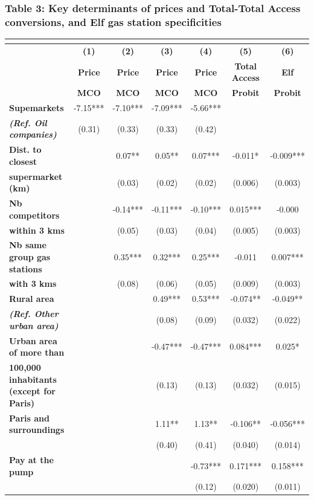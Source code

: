 \documentclass[english]{article}
\begin{document}
\subsubsection*{Table 3: Key determinants of prices and Total-Total Access conversions, and Elf gas station specificities}

\begin{center}
\begin{footnotesize} %
\begin{tabular}{l|cccccc}
\multicolumn{1}{l}{} &  &  &  &  &  & \tabularnewline
\hline
\hline
 & \textbf{(1)}  & \textbf{(2)}  & \textbf{(3)}  & \textbf{(4)}  & \textbf{(5)}  & \textbf{(6)}\tabularnewline
 & \textbf{Price}  & \textbf{Price}  & \textbf{Price}  & \textbf{Price}  & \textbf{Total Access}  & \textbf{Elf}\tabularnewline
 & \textbf{MCO}  & \textbf{MCO}  & \textbf{MCO}  & \textbf{MCO}  & \textbf{Probit}  & \textbf{Probit}\tabularnewline
\hline
\textbf{Supemarkets}  & -7.15{*}{*}{*}  & -7.10{*}{*}{*}  & -7.09{*}{*}{*}  & -5.66{*}{*}{*}  &  & \tabularnewline
\textbf{\textit{(Ref. Oil companies)}}  & (0.31)  & (0.33)  & (0.33)  & (0.42)  &  & \tabularnewline
\hline
\textbf{Dist. to closest}  &  & 0.07{*}{*}  & 0.05{*}{*}  & 0.07{*}{*}{*}  & -0.011{*}  & -0.009{*}{*}{*}\tabularnewline
\textbf{supermarket (km)}  &  & (0.03)  & (0.02)  & (0.02)  & (0.006)  & (0.003)\tabularnewline
\textbf{Nb competitors}  &  & -0.14{*}{*}{*}  & -0.11{*}{*}{*}  & -0.10{*}{*}{*}  & 0.015{*}{*}{*}  & -0.000\tabularnewline
\textbf{within 3 kms}  &  & (0.05)  & (0.03)  & (0.04)  & (0.005)  & (0.003)\tabularnewline
\textbf{Nb same group gas stations}  &  & 0.35{*}{*}{*}  & 0.32{*}{*}{*}  & 0.25{*}{*}{*}  & -0.011  & 0.007{*}{*}{*}\tabularnewline
\textbf{with 3 kms}  &  & (0.08)  & (0.06)  & (0.05)  & (0.009)  & (0.003)\tabularnewline
\hline
\textbf{Rural area}  &  &  & 0.49{*}{*}{*}  & 0.53{*}{*}{*}  & -0.074{*}{*}  & -0.049{*}{*}\tabularnewline
\textbf{\textit{(Ref. Other urban area)}}  &  &  & (0.08)  & (0.09)  & (0.032)  & (0.022)\tabularnewline
\textbf{Urban area of more than}  &  &  & -0.47{*}{*}{*}  & -0.47{*}{*}{*}  & 0.084{*}{*}{*}  & 0.025{*}\tabularnewline
\textbf{100,000 inhabitants (except for Paris)}  &  &  & (0.13)  & (0.13)  & (0.032)  & (0.015)\tabularnewline
\textbf{Paris and surroundings}  &  &  & 1.11{*}{*}  & 1.13{*}{*}  & -0.106{*}{*}  & -0.056{*}{*}{*}\tabularnewline
 &  &  & (0.40)  & (0.41)  & (0.040)  & (0.014)\tabularnewline
\hline
\textbf{Pay at the pump}  &  &  &  & -0.73{*}{*}{*}  & 0.171{*}{*}{*}  & 0.158{*}{*}{*}\tabularnewline
 &  &  &  & (0.12)  & (0.020)  & (0.011)\tabularnewline

\end{tabular}
\end{footnotesize}
\end{center}
\end{document}
